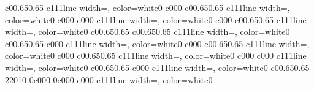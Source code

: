\documentclass{standalone}
\begin{document}
\begin{knitdiagram}
{c}{0}{0.65}{0.65}
{c}{1}{1}{1}{line width=\outlineThickness*\dx, color=white}{0}
{c}{0}{0}{0}
{c}{0}{0.65}{0.65}
{c}{1}{1}{1}{line width=\outlineThickness*\dx, color=white}{0}
{c}{0}{0}{0}
{c}{0}{0}{0}
{c}{1}{1}{1}{line width=\outlineThickness*\dx, color=white}{0}
{c}{0}{0}{0}
{c}{0}{0.65}{0.65}
{c}{1}{1}{1}{line width=\outlineThickness*\dx, color=white}{0}
{c}{0}{0.65}{0.65}
{c}{0}{0.65}{0.65}
{c}{1}{1}{1}{line width=\outlineThickness*\dx, color=white}{0}
{c}{0}{0.65}{0.65}
{c}{0}{0}{0}
{c}{1}{1}{1}{line width=\outlineThickness*\dx, color=white}{0}
{c}{0}{0}{0}
{c}{0}{0.65}{0.65}
{c}{1}{1}{1}{line width=\outlineThickness*\dx, color=white}{0}
{c}{0}{0}{0}
{c}{0}{0.65}{0.65}
{c}{1}{1}{1}{line width=\outlineThickness*\dx, color=white}{0}
{c}{0}{0}{0}
{c}{0}{0}{0}
{c}{1}{1}{1}{line width=\outlineThickness*\dx, color=white}{0}
{c}{0}{0.65}{0.65}
{c}{0}{0}{0}
{c}{1}{1}{1}{line width=\outlineThickness*\dx, color=white}{0}
{c}{0}{0.65}{0.65}
{2}{2}{0}{10}
{0}{c}{0}{0}{0}
{0}{c}{0}{0}{0}
{c}{0}{0}{0}
{c}{1}{1}{1}{line width=\outlineThickness*\dx, color=white}{0}

\end{knitdiagram}
\end{document}
